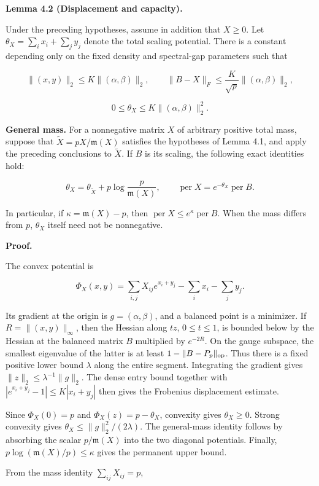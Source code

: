 \documentclass[11pt,a4paper]{article}
\begin{document}
\textbf{Lemma 4.2 (Displacement and capacity).}

Under the preceding hypotheses, assume in addition that \(X\ge0\). Let \(\theta_X=\sum_i x_i+\sum_j y_j\) denote the total scaling potential. There is a constant depending only on the fixed density and spectral-gap parameters such that

\[
\|(x,y)\|_2\le K\|(\alpha,\beta)\|_2,\qquad \|B-X\|_F\le\frac K{\sqrt p}\|(\alpha,\beta)\|_2,
\]

\[
0\le\theta_X\le K\|(\alpha,\beta)\|_2^2.
\]

\textbf{General mass.} For a nonnegative matrix \(X\) of arbitrary positive total mass, suppose that \(\widetilde X=pX/\mathfrak m(X)\) satisfies the hypotheses of Lemma 4.1, and apply the preceding conclusions to \(\widetilde X\). If \(B\) is its scaling, the following exact identities hold:

\[
\theta_X=\theta_{\widetilde X}+p\log\frac p{\mathfrak m(X)},\qquad \operatorname{per}X=e^{-\theta_X}\operatorname{per}B.
\]

In particular, if \(\kappa=\mathfrak m(X)-p\), then \(\operatorname{per}X\le e^\kappa\operatorname{per}B\). When the mass differs from \(p\), \(\theta_X\) itself need not be nonnegative.

\textbf{Proof.}

The convex potential is

\[
\Phi_X(x,y)=\sum_{i,j}X_{ij}e^{x_i+y_j}-\sum_i x_i-\sum_j y_j.
\]

Its gradient at the origin is \(g=(\alpha,\beta)\), and a balanced point is a minimizer. If \(R=\|(x,y)\|_\infty\), then the Hessian along \(tz\), \(0\le t\le1\), is bounded below by the Hessian at the balanced matrix \(B\) multiplied by \(e^{-2R}\). On the gauge subspace, the smallest eigenvalue of the latter is at least \(1-\|B-P_p\|_{\rm op}\). Thus there is a fixed positive lower bound \(\lambda\) along the entire segment. Integrating the gradient gives \(\|z\|_2\le\lambda^{-1}\|g\|_2\). The dense entry bound together with \(|e^{x_i+y_j}-1|\le K|x_i+y_j|\) then gives the Frobenius displacement estimate.

Since \(\Phi_X(0)=p\) and \(\Phi_X(z)=p-\theta_X\), convexity gives \(\theta_X\ge0\). Strong convexity gives \(\theta_X\le\|g\|_2^2/(2\lambda)\). The general-mass identity follows by absorbing the scalar \(p/\mathfrak m(X)\) into the two diagonal potentials. Finally, \(p\log(\mathfrak m(X)/p)\le\kappa\) gives the permanent upper bound.

From the mass identity \(\sum_{ij}X_{ij}=p\),
\end{document}
